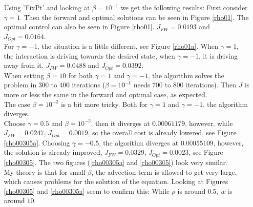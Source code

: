 \documentclass[11pt, a4paper]{article}
\theoremstyle{definition}
\begin{document}
Using 'FixPt' and looking at $\beta = 10^{-1}$ we get the following results:
First consider $\gamma = 1$.
Then the forward and optimal solutions can be seen in Figure \ref{rho01}. The optimal control can also be seen in Figure \ref{rho01}. $J_{FW} = 0.0193$ and $J_{Opt} = 0.0164$.\\
For $\gamma = -1$, the situation is a little different, see Figure \ref{rho01a}. When $\gamma =1$, the interaction is driving towards the desired state, when $\gamma = -1$, it is driving away from it. $J_{FW} = 0.0488$ and $J_{Opt}= 0.0392$.\\
When setting $\beta = 10$ for both $\gamma =1$ and $\gamma =-1$, the algorithm solves the problem in $300$ to $400$ iterations ($\beta = 10^{-1}$ needs $700$ to $800$ iterations). Then $J$ is more or less the same in the forward and optimal case, as expected.\\
The case $\beta = 10^{-3}$ is a bit more tricky. Both for $\gamma = 1$ and $\gamma = -1$, the algorithm diverges.\\
Choose $\gamma = 0.5$ and $\beta = 10^{-3}$, then it diverges at $0.00061179$, however, while $J_{FW} = 0.0247$, $J_{Opt} = 0.0019$, so the overall cost is already lowered, see Figure \ref{rho00305a}.
Choosing $\gamma = -0.5$, the algorithm diverges at $0.00055109$, however, the solution is already improved, $J_{FW} = 0.0329$, $J_{Opt} = 0.0023$, see Figure \ref{rho00305}.
The two figures (\ref{rho00305a} and \ref{rho00305}) look very similar.\\
My theory is that for small $\beta$, the advection term is allowed to get very large, which causes problems for the solution of the equation. Looking at Figures \ref{rho00305} and \ref{rho00305a} seem to confirm this: While $\rho$ is around $0.5$, $w$ is around $10$.
\end{document}
